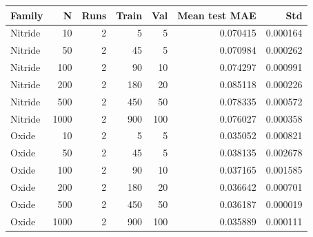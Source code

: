 \begin{tabular}{lrrrrrr}
\toprule
Family & N & Runs & Train & Val & Mean test MAE & Std \\
\midrule
Nitride & 10 & 2 & 5 & 5 & 0.070415 & 0.000164 \\
Nitride & 50 & 2 & 45 & 5 & 0.070984 & 0.000262 \\
Nitride & 100 & 2 & 90 & 10 & 0.074297 & 0.000991 \\
Nitride & 200 & 2 & 180 & 20 & 0.085118 & 0.000226 \\
Nitride & 500 & 2 & 450 & 50 & 0.078335 & 0.000572 \\
Nitride & 1000 & 2 & 900 & 100 & 0.076027 & 0.000358 \\
Oxide & 10 & 2 & 5 & 5 & 0.035052 & 0.000821 \\
Oxide & 50 & 2 & 45 & 5 & 0.038135 & 0.002678 \\
Oxide & 100 & 2 & 90 & 10 & 0.037165 & 0.001585 \\
Oxide & 200 & 2 & 180 & 20 & 0.036642 & 0.000701 \\
Oxide & 500 & 2 & 450 & 50 & 0.036187 & 0.000019 \\
Oxide & 1000 & 2 & 900 & 100 & 0.035889 & 0.000111 \\
\bottomrule
\end{tabular}
